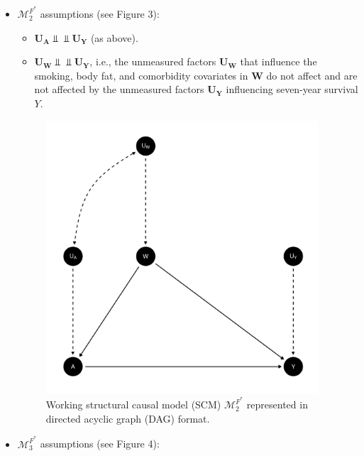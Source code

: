 \documentclass{article}\usepackage[]{graphicx}\usepackage[]{xcolor}
\newenvironment{knitrout}{}{} %
\begin{document}
\begin{enumerate}[label=\textbf{\arabic*.}]
\begin{enumerate}[label=\textbf{(\alph*)}]
\begin{itemize}
\pagebreak

  \item $\mathcal{M}^{F^*}_2$ assumptions (see Figure 3): 
  
  \begin{itemize} 
  
    \item $\bm{U_A} \Perp \!\!\!\! \Perp \bm{U_Y}$ (as above).
    
    \item $\bm{U_W} \Perp \!\!\!\! \Perp \bm{U_Y}$, i.e., the unmeasured factors $\bm{U_W}$ that influence the smoking, body fat, and comorbidity covariates in $\bm{W}$ do not affect and are not affected by the unmeasured factors $\bm{U_Y}$ influencing seven-year survival $Y$.
    
  \end{itemize}
  
\begin{figure}
  \caption{Working structural causal model (SCM) $\mathcal{M}^{F^*}_2$ represented in directed acyclic graph (DAG) format.}
  \centering
  
\begin{knitrout}
\color{fgcolor}
\includegraphics[width=4in]{figure/unnamed-chunk-4-1} 

\end{knitrout}

\end{figure}

\pagebreak

  \item $\mathcal{M}^{F^*}_3$ assumptions (see Figure 4): 
  

\end{itemize}
\end{enumerate}
\end{enumerate}
\end{document}
